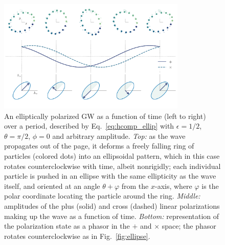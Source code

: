 \documentclass[aps,prd,twocolumn,superscriptaddress,preprintnumbers,floatfix,nofootinbib]{revtex4-2}
\begin{document}
\begin{figure}
\includegraphics[width=0.8\textwidth]{pol_diagram_ellip}
\caption{An elliptically polarized GW as a function of time (left to right) over a period, described by Eq.~\eqref{eq:hcomp_ellip} with $\epsilon=1/2$, $\theta=\pi/2$, $\phi=0$ and arbitrary amplitude. \emph{Top:} as the wave propagates out of the page, it deforms a freely falling ring of particles (colored dots) into an ellipsoidal pattern, which in this case rotates counterclockwise with time, albeit nonrigidly; each individual particle is pushed in an ellipse with the same ellipticity as the wave itself, and oriented at an angle $\theta + \varphi$ from the $x$-axis, where $\varphi$ is the polar coordinate locating the particle around the ring.
\emph{Middle:} amplitudes of the plus (solid) and cross (dashed) linear polarizations making up the wave as a function of time.
\emph{Bottom:} representation of the polarization state as a phasor in the $+$ and $\times$ space; the phasor rotates counterclockwise as in Fig.~\ref{fig:ellipse}.
}
\label{fig:pol_diagram_ellip}
\end{figure}

\newcommand{\jonesbasis}{\vec{\mathfrak{e}}}
\end{document}
